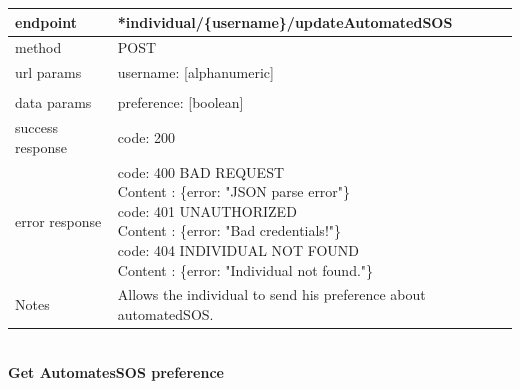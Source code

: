 \begin{legal}
\begin{legal}
\begin{itemize}
								\begin{tabularx}{\linewidth}{| l| l }
									\hline
									endpoint & *individual/\{username\}/updateAutomatedSOS \\
									\hline
									method & POST \\
									\hline
									url params & 
									\parbox{0.7\textwidth}{
										\bigskip
										username: [alphanumeric]
										\bigskip
									}\\\\
									\hline
									data params &
									\parbox{0.7\textwidth}{
										\bigskip
										preference: [boolean]
										\bigskip
									} \\
									\hline
									success response &
									\parbox{0.7\textwidth}{
										\bigskip
										code: 200
										\bigskip
									} \\
									\hline
									error response &
									\parbox{0.7\textwidth}{
										\bigskip
										code: 400 BAD REQUEST \\
										Content : \{error: "JSON parse error"\}\\
										code: 401 UNAUTHORIZED \\
										Content : \{error: "Bad credentials!"\}\\
										code: 404 INDIVIDUAL NOT FOUND \\
										Content : \{error: "Individual not found."\}
										\bigskip
									} \\
									\hline
									Notes & 
									\parbox{0.7\textwidth}{
										\bigskip Allows the individual to send his preference about automatedSOS.
									\bigskip}  \\
									\hline
								\end{tabularx}\\
								
								\textbf{Get AutomatesSOS preference} \\
			

\end{itemize}
\end{legal}
\end{legal}
